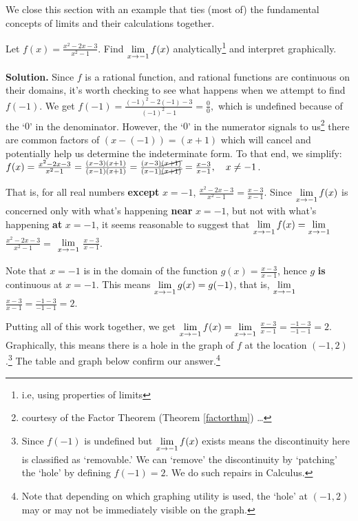 \documentclass{ximera}
\begin{document}
\medskip

We close this section with an example that ties (most of) the fundamental concepts of limits and their calculations together.

\medskip

\begin{example} \label{rationallimit}  Let  $f(x) =  \frac{x^2-2x-3}{x^2-1}$.  Find $\ds{\lim_{x \rightarrow -1} f(x)}$ analytically\footnote{i.e, using properties of limits} and interpret graphically.

\medskip

{\bf Solution.}  Since $f$ is a rational function, and rational functions are continuous on their domains, it's worth checking to see what happens when we attempt to find $f(-1)$.  We get  $f(-1) = \frac{(-1)^2 - 2(-1)-3}{(-1)^2-1} = \frac{0}{0},$ which is undefined because of the `$0$' in the denominator.  However, the `$0$' in the numerator signals to us\footnote{courtesy of the Factor Theorem (Theorem \ref{factorthm}) \ldots} there are common factors of $(x-(-1)) = (x+1)$ which will cancel and potentially help us determine the indeterminate form.  To that end, we simplify: $f(x) =  \frac{x^2-2x-3}{x^2-1} = \frac{(x-3)(x+1)}{(x-1)(x+1)} = \frac{(x-3)\cancel{(x+1)}}{(x-1)\cancel{(x+1)}} = \frac{x-3}{x-1}, \quad x \neq -1$. 

\medskip

That is, for all real numbers \textbf{except} $x = -1$, $\frac{x^2-2x-3}{x^2-1} = \frac{x-3}{x-1}$.   Since $\ds{\lim_{x \rightarrow -1} f(x)}$ is concerned only with what's happening \textbf{near} $x = -1$, but not with what's happening \textbf{at} $x = -1$, it seems reasonable to suggest that $\ds{\lim_{x \rightarrow -1} f(x) =  \lim_{x \rightarrow -1}}$  $\frac{x^2-2x-3}{x^2-1} =$  $\ds{\lim_{x \rightarrow -1}}$ $\frac{x-3}{x-1}$.

\medskip

Note that $x = -1$ is in the domain of the function $g(x) = \frac{x-3}{x-1}$, hence $g$  \textbf{is} continuous at $x = -1$.   This means $\ds{\lim_{x \rightarrow -1} g(x) = g(-1)}$, that is, $\ds{\lim_{x \rightarrow -1}}$ $\frac{x-3}{x-1} = \frac{-1-3}{-1-1} = 2$.

\medskip

Putting all of this work together, we get $\ds{\lim_{x \rightarrow -1} f(x) =   \lim_{x \rightarrow -1}}$ $ \frac{x-3}{x-1}  =  \frac{-1-3}{-1-1} = 2$.   Graphically, this means there is a hole in the graph of $f$ at the location $(-1,2)$.\footnote{Since $f(-1)$ is undefined but  $\ds{\lim_{x \rightarrow -1} f(x)}$ exists means the discontinuity here is classified as `removable.'  We can `remove' the discontinuity by `patching' the `hole' by defining $f(-1) = 2$. We do such repairs in Calculus.}  The table and graph below confirm our answer.\footnote{Note that depending on which graphing utility is used, the `hole' at $(-1,2)$ may or may not be immediately visible on the graph.}


\end{example}
\end{document}
